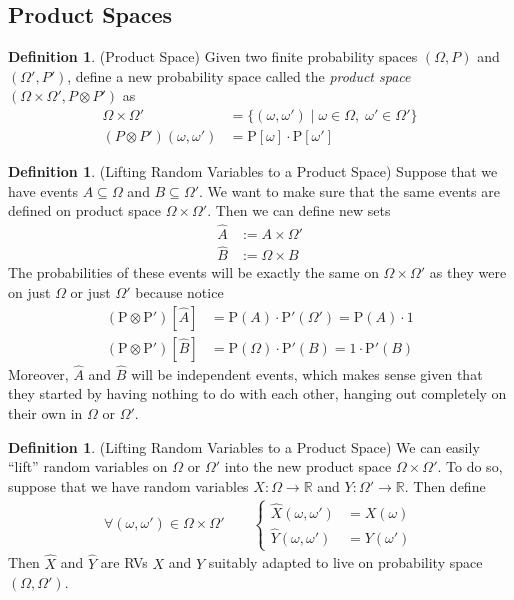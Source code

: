 \documentclass[12pt]{article}
\theoremstyle{plain}
\theoremstyle{definition}
\newtheorem{defn}[thm]{Definition}
\theoremstyle{remark}
\newcommand{\Prb}{\mathrm{P}}
\newcommand{\ra}{\rightarrow}
\newcommand{\R}{\mathbb{R}}
\begin{document}
\subsection{Product Spaces}

\begin{defn}{(Product Space)}
Given two finite probability spaces $(\Omega,P)$ and $(\Omega',P')$,
define a new probability space called the \emph{product space}
$(\Omega\times\Omega', P \otimes P')$ as
\begin{align*}
  \Omega\times\Omega'
  &= \{(\omega,\omega') \; |\; \omega\in\Omega, \; \omega'\in\Omega'\}
  \\
  (P \otimes P')(\omega, \omega')
  &= \Prb[\omega]\cdot \Prb[\omega']
\end{align*}
\end{defn}

\begin{defn}{(Lifting Random Variables to a Product Space)}
Suppose that we have events $A\subseteq \Omega$ and
$B\subseteq \Omega'$. We want to make sure that the same events are
defined on product space $\Omega\times \Omega'$. Then we can define new
sets
\begin{align*}
  \hat{A} &:= A\times \Omega' \\
  \hat{B} &:= \Omega \times B
\end{align*}
The probabilities of these events will be exactly the same on $\Omega
\times \Omega'$ as they were on just $\Omega$ or just $\Omega'$ because
notice
\begin{align*}
  (\Prb\otimes \Prb')[\hat{A}] &= \Prb(A) \cdot \Prb'(\Omega') = \Prb(A) \cdot 1\\
  (\Prb\otimes \Prb')[\hat{B}] &= \Prb(\Omega) \cdot \Prb'(B) = 1\cdot \Prb'(B)
\end{align*}
Moreover, $\hat{A}$ and $\hat{B}$ will be independent events, which
makes sense given that they started by having nothing to do with each
other, hanging out completely on their own in $\Omega$ or $\Omega'$.
\end{defn}

\begin{defn}{(Lifting Random Variables to a Product Space)}
We can easily ``lift'' random variables on $\Omega$ or $\Omega'$ into
the new product space $\Omega\times \Omega'$. To do so, suppose that we
have random variables $X:\Omega\ra\R$ and $Y:\Omega'\ra\R$. Then define
\begin{align*}
  \forall (\omega,\omega') \in \Omega\times \Omega' \qquad
  \begin{cases}
  \hat{X}(\omega, \omega') &= X(\omega) \\
  \hat{Y}(\omega, \omega') &= Y(\omega')
  \end{cases}
\end{align*}
Then $\hat{X}$ and $\hat{Y}$ are RVs $X$ and $Y$ suitably adapted to
live on probability space $(\Omega,\Omega')$.
\end{defn}
\end{document}
